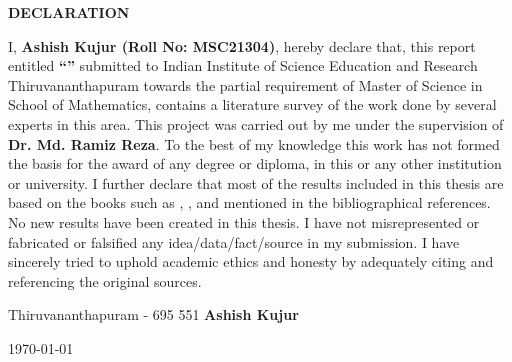 \thispagestyle{empty}
\begin{center}
{\Large{\bf{DECLARATION}}}
\end{center}

\noindent

I, \textbf{Ashish Kujur (Roll No: MSC21304)}, hereby declare that, this report entitled \textbf{“\ttle”} submitted to Indian Institute of Science Education and Research Thiruvananthapuram towards the partial requirement of Master of Science in School of Mathematics,  contains a literature survey of the work done by several experts in this area.  This project was carried out by me under the supervision of \textbf{Dr. Md. Ramiz Reza}.  To the best of my knowledge this work has not formed the basis for the award of any degree or diploma, in this or any other institution or university. I further declare that most of the results included in this thesis are based on the books such as \cite{hoffman2007banach}, \cite{mashreghi2009representation}, \cite{koosis1998introduction} and \cite{axler2013harmonic} mentioned in the bibliographical references. No new results have been created in this thesis. I have not misrepresented or fabricated or falsified any idea/data/fact/source in my submission. I have sincerely tried to uphold academic ethics and honesty by adequately citing and referencing the original sources. 

\vspace{4cm} %

\noindent Thiruvananthapuram - 695 551 \hfill \textbf{Ashish Kujur}

\noindent \today \hfill

\clearpage
